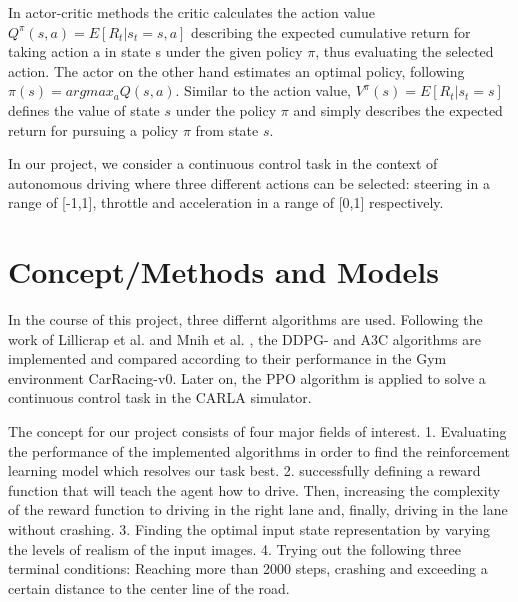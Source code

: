 \documentclass[letterpaper, 10 pt, conference]{ieeeconf}  %
\begin{document}
In actor-critic methods the critic calculates the action value $Q^\pi(s,a) = E[R_t|s_t=s,a]$ describing the expected cumulative return for taking action a in state s under the given policy $\pi$, thus evaluating the selected action. The actor on the other hand estimates an optimal policy, following $\pi(s) = argmax_aQ(s,a)$. Similar to the action value, $V^\pi(s) = E[R_t|s_t=s]$ defines the value of state $s$ under the policy $\pi$ and simply describes the expected return for pursuing a policy $\pi$ from state $s$.

In our project, we consider a continuous control task in the context of autonomous driving where three different actions can be selected: steering in a range of [-1,1], throttle  and acceleration in a range of [0,1] respectively.

\section{Concept/Methods and Models}

In the course of this project, three differnt algorithms are used. Following the work of Lillicrap et al. \cite{lillicrapContinuousControlDeep2015} and Mnih et al. \cite{mnihAsynchronousMethodsDeep2016}, the DDPG- and A3C algorithms are implemented and compared according to their performance in the Gym environment CarRacing-v0. Later on, the PPO algorithm is applied to solve a continuous control task in the CARLA simulator.

The concept for our project consists of four major fields of interest. 1. Evaluating the performance of the implemented algorithms in order to find the reinforcement learning model which resolves our task best. 2. successfully defining a reward function that will teach the agent how to drive. Then, increasing the complexity of the reward function to driving in the right lane and, finally, driving in the lane without crashing. 3. Finding the optimal input state representation by varying the levels of realism of the input images. 4. Trying out the following three terminal conditions: Reaching more than 2000 steps, crashing and exceeding a certain distance to the center line of the road.
\end{document}
